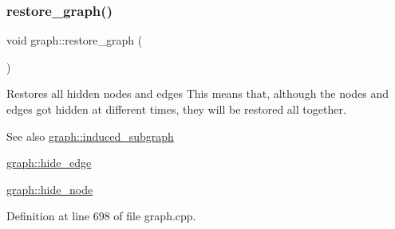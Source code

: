 \mbox{\label{classgraph_a53e2a5505fa6427587e12d66e4a86cec}} 
\subsubsection{\texorpdfstring{restore\+\_\+graph()}{restore\_graph()}}
{\footnotesize\ttfamily void graph\+::restore\+\_\+graph (\begin{DoxyParamCaption}{ }\end{DoxyParamCaption})}

Restores all hidden nodes and edges This means that, although the nodes and edges got hidden at different times, they will be restored all together.

\begin{DoxySeeAlso}{See also}
\mbox{\hyperlink{classgraph_a15b766094bb0b97ef53e06e7c26b2197}{graph\+::induced\+\_\+subgraph}} 

\mbox{\hyperlink{classgraph_ab2f8520bcac080d73c55228fecc61825}{graph\+::hide\+\_\+edge}} 

\mbox{\hyperlink{classgraph_a214618b5e3c02695779350532506e225}{graph\+::hide\+\_\+node}} 
\end{DoxySeeAlso}


Definition at line 698 of file graph.\+cpp.


